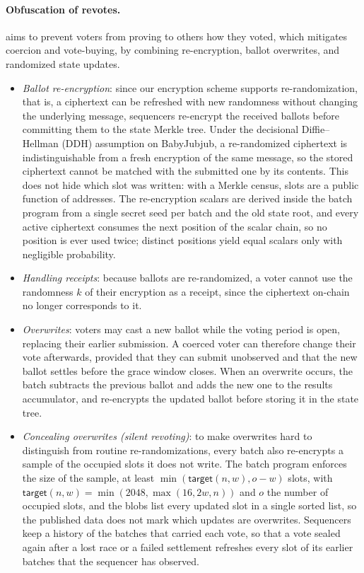 \paragraph{Obfuscation of revotes.} \Davinci aims to prevent voters from proving to others how they voted, which mitigates coercion and vote-buying, by combining re-encryption, ballot overwrites, and randomized state updates.
\begin{itemize}
	\item \textit{Ballot re-encryption}: since our encryption scheme supports re-randomization, that is, a ciphertext can be refreshed with new randomness without changing the underlying message, sequencers re-encrypt the received ballots before committing them to the state Merkle tree. Under the decisional Diffie--Hellman (DDH) assumption on BabyJubjub, a re-randomized ciphertext is indistinguishable from a fresh encryption of the same message, so the stored ciphertext cannot be matched with the submitted one by its contents. This does not hide which slot was written: with a Merkle census, slots are a public function of addresses. The re-encryption scalars are derived inside the batch program from a single secret seed per batch and the old state root, and every active ciphertext consumes the next position of the scalar chain, so no position is ever used twice; distinct positions yield equal scalars only with negligible probability.
	\item \textit{Handling receipts}: because ballots are re-randomized, a voter cannot use the randomness $k$ of their encryption as a receipt, since the ciphertext on-chain no longer corresponds to it.
	\item \textit{Overwrites}: voters may cast a new ballot while the voting period is open, replacing their earlier submission. A coerced voter can therefore change their vote afterwards, provided that they can submit unobserved and that the new ballot settles before the grace window closes. When an overwrite occurs, the batch subtracts the previous ballot and adds the new one to the results accumulator, and re-encrypts the updated ballot before storing it in the state tree.
	\item \textit{Concealing overwrites (silent revoting)}: to make overwrites hard to distinguish from routine re-randomizations, every batch also re-encrypts a sample of the occupied slots it does not write. The batch program enforces the size of the sample, at least $\min(\mathsf{target}(n, w), o - w)$ slots, with $\mathsf{target}(n, w) = \min(2048, \max(16, 2w, n))$ and $o$ the number of occupied slots, and the blobs list every updated slot in a single sorted list, so the published data does not mark which updates are overwrites. Sequencers keep a history of the batches that carried each vote, so that a vote sealed again after a lost race or a failed settlement refreshes every slot of its earlier batches that the sequencer has observed.
\end{itemize}
